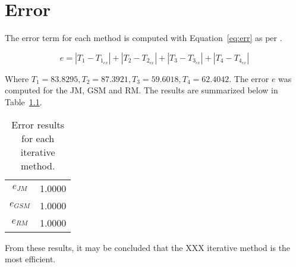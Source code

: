 \chapter{Error}
\label{chap:error}

The error term for each method is computed with Equation~\ref{eq:err} as per \cite{assign}.

\begin{equation}
	\label{eq:err}	
	e = |T_1 - T_{1_{ex}}|+|T_2 - T_{2_{ex}}|+|T_3 - T_{3_{ex}}|+|T_4 - T_{4_{ex}}|
\end{equation}

Where $T_1 = 83.8295, T_2 = 87.3921, T_3 = 59.6018, T_4 = 62.4042$. The error $e$ was computed for the JM, GSM and RM. The results are summarized below in Table~\ref{tab:err}.

\begin{table}[H]
  \centering
  \caption{Error results for each iterative method.}
    \begin{tabular}{c|c}
    $e_{JM}$ 	& 1.0000 \\
    $e_{GSM}$ 	& 1.0000 \\
    $e_{RM}$ 	& 1.0000 \\
    \end{tabular}
  \label{tab:err}
\end{table}

From these results, it may be concluded that the XXX iterative method is the most efficient.


